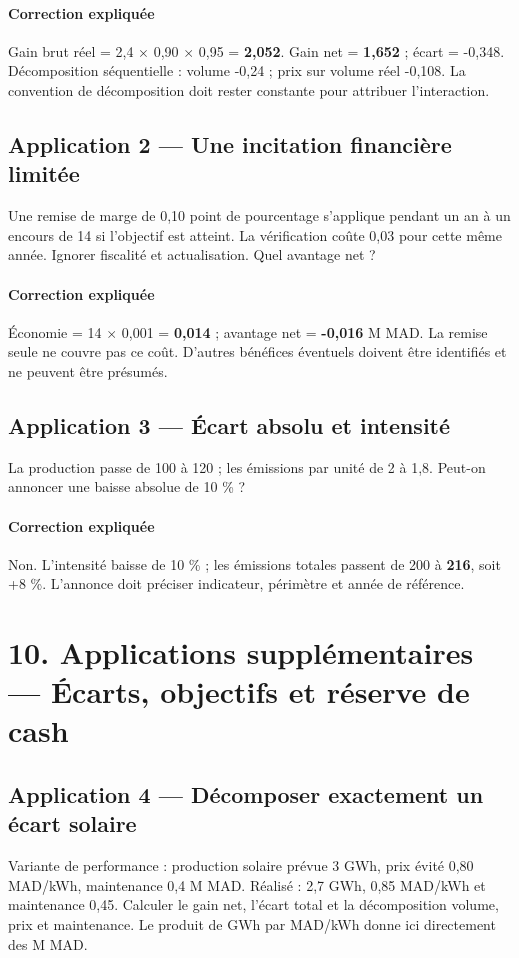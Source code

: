 \documentclass[12pt,a4paper]{article}
\begin{document}
\paragraph{Correction expliquée}
Gain brut réel = 2,4 $\times$ 0,90 $\times$ 0,95 = \textbf{2,052}. Gain net = \textbf{1,652} ; écart = -0,348. Décomposition séquentielle : volume -0,24 ; prix sur volume réel -0,108. La convention de décomposition doit rester constante pour attribuer l’interaction.



\subsection*{Application 2 --- Une incitation financière limitée}
Une remise de marge de 0,10 point de pourcentage s’applique pendant un an à un encours de 14 si l’objectif est atteint. La vérification coûte 0,03 pour cette même année. Ignorer fiscalité et actualisation. Quel avantage net ?


\paragraph{Correction expliquée}
Économie = 14 $\times$ 0,001 = \textbf{0,014} ; avantage net = \textbf{-0,016} M MAD. La remise seule ne couvre pas ce coût. D’autres bénéfices éventuels doivent être identifiés et ne peuvent être présumés.



\subsection*{Application 3 --- Écart absolu et intensité}
La production passe de 100 à 120 ; les émissions par unité de 2 à 1,8. Peut-on annoncer une baisse absolue de 10 \% ?


\paragraph{Correction expliquée}
Non. L’intensité baisse de 10 \% ; les émissions totales passent de 200 à \textbf{216}, soit +8 \%. L’annonce doit préciser indicateur, périmètre et année de référence.

\section*{10. Applications supplémentaires --- Écarts, objectifs et réserve de cash}

\subsection*{Application 4 --- Décomposer exactement un écart solaire}
Variante de performance : production solaire prévue 3 GWh, prix évité 0,80 MAD/kWh, maintenance 0,4 M MAD. Réalisé : 2,7 GWh, 0,85 MAD/kWh et maintenance 0,45. Calculer le gain net, l’écart total et la décomposition volume, prix et maintenance. Le produit de GWh par MAD/kWh donne ici directement des M MAD.
\end{document}
